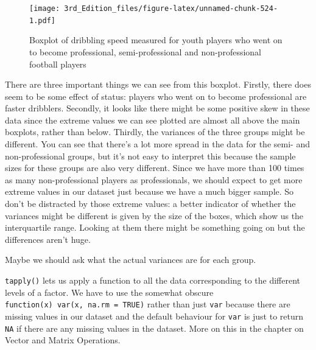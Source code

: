\documentclass[
]{book}
\newenvironment{Shaded}{\begin{snugshade}}{\end{snugshade}}
\newcommand{\ControlFlowTok}[1]{\textcolor[rgb]{0.13,0.29,0.53}{\textbf{#1}}}
\newcommand{\DataTypeTok}[1]{\textcolor[rgb]{0.13,0.29,0.53}{#1}}
\newcommand{\FloatTok}[1]{\textcolor[rgb]{0.00,0.00,0.81}{#1}}
\newcommand{\KeywordTok}[1]{\textcolor[rgb]{0.13,0.29,0.53}{\textbf{#1}}}
\newcommand{\NormalTok}[1]{#1}
\newcommand{\OperatorTok}[1]{\textcolor[rgb]{0.81,0.36,0.00}{\textbf{#1}}}
\newcommand{\OtherTok}[1]{\textcolor[rgb]{0.56,0.35,0.01}{#1}}
\begin{document}
\begin{figure}
\centering
\texttt{[image: 3rd\_Edition\_files/figure-latex/unnamed-chunk-524-1.pdf]}
\caption{\label{fig:unnamed-chunk-524}Boxplot of dribbling speed measured for youth players who went on to become professional, semi-professional and non-professional football players}
\end{figure}

There are three important things we can see from this boxplot. Firstly, there does seem to be some effect of status: players who went on to become professional are faster dribblers. Secondly, it looks like there might be some positive skew in these data since the extreme values we can see plotted are almost all above the main boxplots, rather than below. Thirdly, the variances of the three groups might be different. You can see that there's a lot more spread in the data for the semi- and non-professional groups, but it's not easy to interpret this because the sample sizes for these groups are also very different. Since we have more than 100 times as many non-professional players as professionals, we should expect to get more extreme values in our dataset just because we have a much bigger sample. So don't be distracted by those extreme values: a better indicator of whether the variances might be different is given by the size of the boxes, which show us the interquartile range. Looking at them there might be something going on but the differences aren't huge.

Maybe we should ask what the actual variances are for each group.

\begin{Shaded}
\end{Shaded}

\texttt{tapply()} lets us apply a function to all the data corresponding to the different levels of a factor. We have to use the somewhat obscure \texttt{function(x)\ var(x,\ na.rm\ =\ TRUE)} rather than just \texttt{var} because there are missing values in our dataset and the default behaviour for \texttt{var} is just to return \texttt{NA} if there are any missing values in the dataset. More on this in the chapter on Vector and Matrix Operations.
\end{document}
